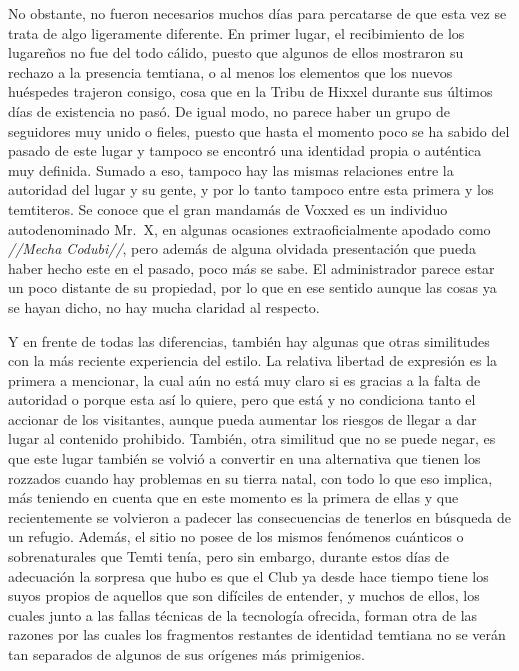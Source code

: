 \documentclass[
  spanish,
]{book}
\begin{document}
No obstante, no fueron necesarios muchos días para percatarse de que esta vez se trata de algo ligeramente diferente. En primer lugar, el recibimiento de los lugareños no fue del todo cálido, puesto que algunos de ellos mostraron su rechazo a la presencia temtiana, o al menos los elementos que los nuevos huéspedes trajeron consigo, cosa que en la Tribu de Hixxel durante sus últimos días de existencia no pasó. De igual modo, no parece haber un grupo de seguidores muy unido o fieles, puesto que hasta el momento poco se ha sabido del pasado de este lugar y tampoco se encontró una identidad propia o auténtica muy definida. Sumado a eso, tampoco hay las mismas relaciones entre la autoridad del lugar y su gente, y por lo tanto tampoco entre esta primera y los temtiteros. Se conoce que el gran mandamás de Voxxed es un individuo autodenominado Mr.~X, en algunas ocasiones extraoficialmente apodado como \emph{//Mecha Codubi//}, pero además de alguna olvidada presentación que pueda haber hecho este en el pasado, poco más se sabe. El administrador parece estar un poco distante de su propiedad, por lo que en ese sentido aunque las cosas ya se hayan dicho, no hay mucha claridad al respecto.

Y en frente de todas las diferencias, también hay algunas que otras similitudes con la más reciente experiencia del estilo. La relativa libertad de expresión es la primera a mencionar, la cual aún no está muy claro si es gracias a la falta de autoridad o porque esta así lo quiere, pero que está y no condiciona tanto el accionar de los visitantes, aunque pueda aumentar los riesgos de llegar a dar lugar al contenido prohibido. También, otra similitud que no se puede negar, es que este lugar también se volvió a convertir en una alternativa que tienen los rozzados cuando hay problemas en su tierra natal, con todo lo que eso implica, más teniendo en cuenta que en este momento es la primera de ellas y que recientemente se volvieron a padecer las consecuencias de tenerlos en búsqueda de un refugio. Además, el sitio no posee de los mismos fenómenos cuánticos o sobrenaturales que Temti tenía, pero sin embargo, durante estos días de adecuación la sorpresa que hubo es que el Club ya desde hace tiempo tiene los suyos propios de aquellos que son difíciles de entender, y muchos de ellos, los cuales junto a las fallas técnicas de la tecnología ofrecida, forman otra de las razones por las cuales los fragmentos restantes de identidad temtiana no se verán tan separados de algunos de sus orígenes más primigenios.
\end{document}
